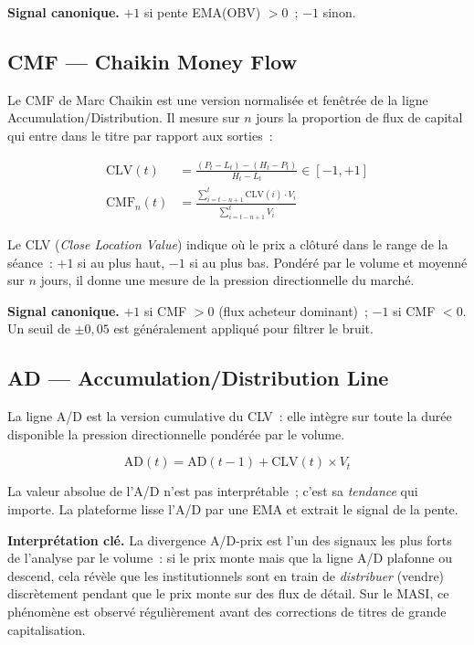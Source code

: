 \textbf{Signal canonique.} $+1$ si pente EMA(OBV) $> 0$~; $-1$ sinon.

\subsection{CMF — Chaikin Money Flow}

Le CMF de Marc Chaikin est une version normalisée et fenêtrée de la ligne
Accumulation/Distribution. Il mesure sur $n$ jours la proportion de flux de capital
qui entre dans le titre par rapport aux sorties~:

\begin{align}
    \text{CLV}(t) &= \frac{(P_t - L_t) - (H_t - P_t)}{H_t - L_t}
        \in [-1, +1] \label{eq:clv} \\[4pt]
    \text{CMF}_n(t) &= \frac{\displaystyle\sum_{i=t-n+1}^{t} \text{CLV}(i) \cdot V_i}
                             {\displaystyle\sum_{i=t-n+1}^{t} V_i}
    \label{eq:cmf}
\end{align}

Le CLV (\textit{Close Location Value}) indique où le prix a clôturé dans le range
de la séance~: $+1$ si au plus haut, $-1$ si au plus bas. Pondéré par le volume et
moyenné sur $n$ jours, il donne une mesure de la pression directionnelle du marché.

\textbf{Signal canonique.} $+1$ si CMF $> 0$ (flux acheteur dominant)~; $-1$ si CMF $< 0$.
Un seuil de $\pm 0{,}05$ est généralement appliqué pour filtrer le bruit.

\subsection{AD — Accumulation/Distribution Line}

La ligne A/D est la version cumulative du CLV~: elle intègre sur toute la durée
disponible la pression directionnelle pondérée par le volume.

\begin{equation}
    \text{AD}(t) = \text{AD}(t-1) + \text{CLV}(t) \times V_t
    \label{eq:ad}
\end{equation}

La valeur absolue de l'A/D n'est pas interprétable~; c'est sa \textit{tendance} qui
importe. La plateforme lisse l'A/D par une EMA et extrait le signal de la pente.

\textbf{Interprétation clé.}
La divergence A/D-prix est l'un des signaux les plus forts de l'analyse par le volume~:
si le prix monte mais que la ligne A/D plafonne ou descend, cela révèle que les
institutionnels sont en train de \textit{distribuer} (vendre) discrètement pendant que
le prix monte sur des flux de détail. Sur le MASI, ce phénomène est observé régulièrement
avant des corrections de titres de grande capitalisation.

